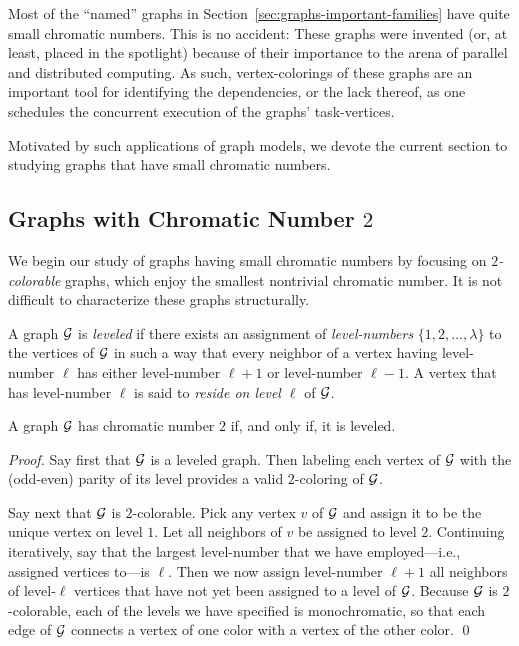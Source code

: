 \bigskip

Most of the ``named'' graphs in Section~\ref{sec:graphs-important-families} have quite small chromatic numbers.  This is no accident: These graphs were invented (or, at least, placed in the spotlight) because of their importance to the arena of parallel and distributed computing.  As such, vertex-colorings of these graphs are an important tool for identifying the dependencies, or the lack thereof, as one schedules the concurrent execution of the graphs' task-vertices.

\smallskip

Motivated by such applications of graph models, we devote the current section to studying graphs that have small chromatic numbers.

\subsection{Graphs with Chromatic Number $2$}
\label{sec:2-color-graphs}

We begin our study of graphs having small chromatic numbers by focusing on {\em $2$-colorable} graphs, which enjoy the smallest nontrivial chromatic number.  It is not difficult to characterize these graphs structurally.

\medskip

 
A graph $\mbox{$\cal G$}$ is {\it leveled} if there exists an assignment of {\it level-numbers} $\{ 1, 2, \ldots, \lambda\}$ to the vertices of $\mbox{$\cal G$}$ in such a way that every neighbor of a vertex having level-number $\ell$ has either level-number $\ell +1$ or level-number $\ell -1$.  A vertex that has level-number $\ell$ is said to {\it reside on level $\ell$} of $\mbox{$\cal G$}$.

\begin{prop}
\label{thm:leveled=2-color}
A graph $\mbox{$\cal G$}$ has chromatic number $2$ if, and only if, it is leveled.
\end{prop}

\begin{proof}
Say first that $\mbox{$\cal G$}$ is a leveled graph.  Then labeling each vertex of $\mbox{$\cal G$}$ with the (odd-even) parity of its level provides a valid $2$-coloring of $\mbox{$\cal G$}$.

\smallskip

Say next that $\mbox{$\cal G$}$ is $2$-colorable.  Pick any vertex $v$ of $\mbox{$\cal G$}$ and assign it to be the unique vertex on level $1$.  Let all neighbors of $v$ be assigned to level $2$.  Continuing iteratively, say that the largest level-number that we have employed---i.e., assigned vertices to---is $\ell$.  Then we now assign level-number $\ell +1$ all neighbors of level-$\ell$ vertices that have not yet been assigned to a level of $\mbox{$\cal G$}$.  Because $\mbox{$\cal G$}$ is $2$-colorable, each of the levels we have specified is monochromatic, so that each edge of $\mbox{$\cal G$}$ connects a vertex of one color with a vertex of the other color.  \qed
\end{proof}

